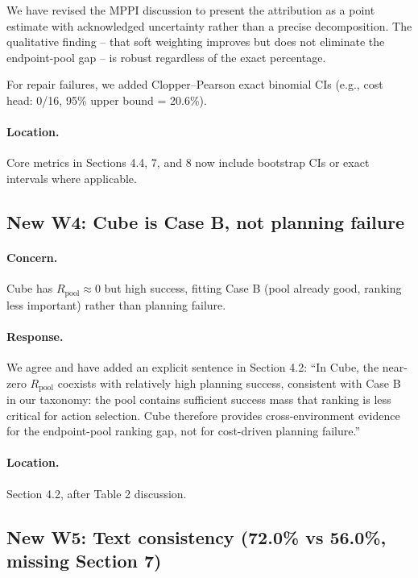 \documentclass[11pt]{article}
\newcommand{\Rpool}{R_{\mathrm{pool}}}
\begin{document}
We have revised the MPPI discussion to present the attribution as a point estimate with acknowledged uncertainty rather than a precise decomposition. The qualitative finding -- that soft weighting improves but does not eliminate the endpoint-pool gap -- is robust regardless of the exact percentage.

For repair failures, we added Clopper--Pearson exact binomial CIs (e.g., cost head: 0/16, 95\% upper bound = 20.6\%).

\paragraph{Location.}
Core metrics in Sections 4.4, 7, and 8 now include bootstrap CIs or exact intervals where applicable.

\subsection*{New W4: Cube is Case B, not planning failure}

\paragraph{Concern.}
Cube has $\Rpool \approx 0$ but high success, fitting Case B (pool already good, ranking less important) rather than planning failure.

\paragraph{Response.}
We agree and have added an explicit sentence in Section 4.2: ``In Cube, the near-zero $\Rpool$ coexists with relatively high planning success, consistent with Case B in our taxonomy: the pool contains sufficient success mass that ranking is less critical for action selection. Cube therefore provides cross-environment evidence for the endpoint-pool ranking gap, not for cost-driven planning failure.''

\paragraph{Location.}
Section 4.2, after Table 2 discussion.

\subsection*{New W5: Text consistency (72.0\% vs 56.0\%, missing Section 7)}
\end{document}
